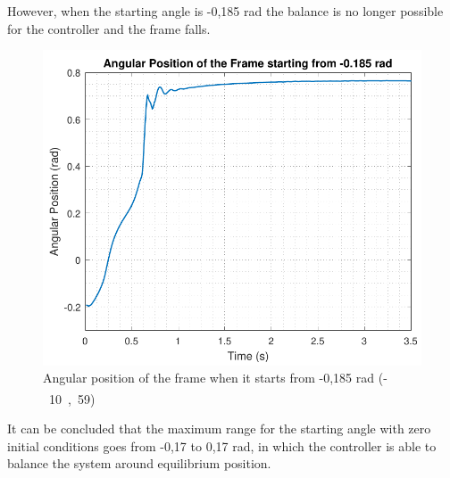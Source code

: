 \begin{minipage}{\linewidth}
\begin{minipage}{0.45\linewidth}
\begin{figure}[H]
			\centering
			\captionsetup{justification=centering}
			\label{testCatch_17}
		\end{figure}
	\end{minipage}
\end{minipage}

However, when the starting angle is -0,185 rad the balance is no longer possible for the controller and the frame falls.
%
\begin{figure}[H] 
	\centering
	\includegraphics[scale=0.60]{figures/testCatch_185}
	\caption{Angular position of the frame when it starts from -0,185 rad (\si{-10,59^\circ})}
	\label{testCatch_185}
\end{figure}
%
It can be concluded that the maximum range for the starting angle with zero initial conditions goes from -0,17 to 0,17 rad, in which the controller is able to balance the system around equilibrium position.